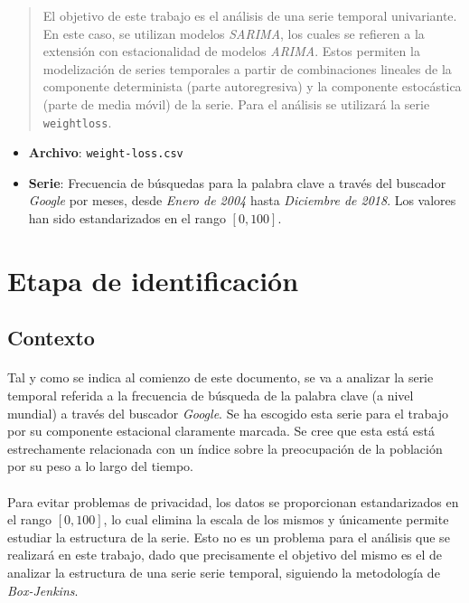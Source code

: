 \documentclass[a4paper, spanish]{article}
\begin{document}
  \maketitle

  \begin{abstract}
		\noindent El objetivo de este trabajo es el análisis de una serie temporal univariante. En este caso, se utilizan modelos \emph{SARIMA}, los cuales se refieren a la extensión con estacionalidad de modelos \emph{ARIMA}. Estos permiten la modelización de series temporales a partir de combinaciones lineales de la componente determinista (parte autoregresiva) y la componente estocástica (parte de media móvil) de la serie. Para el análisis se utilizará la serie \texttt{weightloss}.
	\end{abstract}

  \begin{itemize}
    \item \textbf{Archivo}: \texttt{weight-loss.csv}
    \item \textbf{Serie}: Frecuencia de búsquedas para la palabra clave  a través del buscador \emph{Google} por meses, desde \emph{Enero de 2004} hasta \emph{Diciembre de 2018}. Los valores han sido estandarizados en el rango $[0, 100]$.
  \end{itemize}

  \section{Etapa de identificación}
  \label{sec:1}

    \subsection{Contexto}
    \label{sec:context}

      \paragraph{}
      Tal y como se indica al comienzo de este documento, se va a analizar la serie temporal referida a la frecuencia de búsqueda de la palabra clave  (a nivel mundial) a través del buscador \emph{Google}. Se ha escogido esta serie para el trabajo por su componente estacional claramente marcada. Se cree que esta está está estrechamente relacionada con un índice sobre la preocupación de la población por su peso a lo largo del tiempo.

      \paragraph{}
      Para evitar problemas de privacidad, los datos se proporcionan estandarizados en el rango $[0, 100]$, lo cual elimina la escala de los mismos y únicamente permite estudiar la estructura de la serie. Esto no es un problema para el análisis que se realizará en este trabajo, dado que precisamente el objetivo del mismo es el de analizar la estructura de una serie serie temporal, siguiendo la metodología de \emph{Box-Jenkins}.
\end{document}
